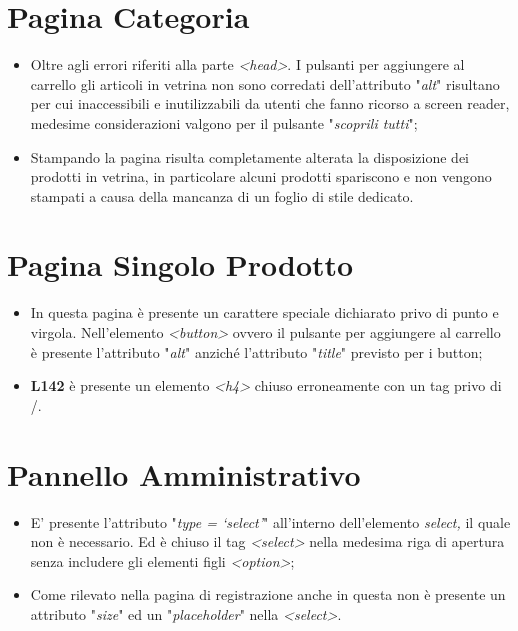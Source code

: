 \section{Pagina Categoria}
\begin{itemize}
	\item Oltre agli errori riferiti alla parte \textit{<head>}.
	I pulsanti per aggiungere al carrello gli articoli in vetrina non sono corredati dell’attributo "\textit{alt}" risultano per cui inaccessibili e inutilizzabili da utenti che fanno ricorso a screen reader, medesime considerazioni valgono per il pulsante "\textit{scoprili tutti}";
	
	\item Stampando la pagina risulta completamente alterata la disposizione dei prodotti in vetrina, in particolare alcuni prodotti spariscono e non vengono stampati a causa della mancanza di un foglio di stile dedicato. 
\end{itemize}
\section{Pagina Singolo Prodotto}
\begin{itemize}
	\item In questa pagina è presente un carattere speciale dichiarato privo di punto e virgola.
	Nell’elemento \textit{<button>} ovvero il pulsante per aggiungere al carrello è presente l’attributo "\textit{alt}" anziché l’attributo "\textit{title}" previsto per i button;
	
	\item \textbf{L142} è presente un elemento \textit{<h4>} chiuso erroneamente con un tag privo di /.  
\end{itemize}
\section{Pannello Amministrativo}
\begin{itemize}
	\item E’ presente l’attributo "\textit{type = ‘select’}" all’interno dell’elemento \textit{select,} il quale non è necessario. Ed è chiuso il tag \textit{<select>} nella medesima riga di apertura senza includere gli elementi figli \textit{<option>};
	
	\item Come rilevato nella pagina di registrazione anche in questa non è presente un attributo "\textit{size}" ed un "\textit{placeholder}" nella \textit{<select>}.   
\end{itemize}

